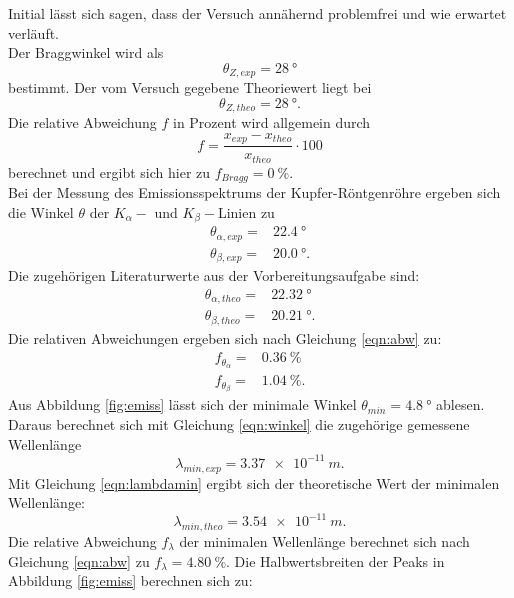 Initial lässt sich sagen, dass der Versuch annähernd problemfrei und wie erwartet verläuft.
\\Der Braggwinkel wird als
\begin{equation*}
  \theta_{Z, exp}=\SI{28}{°}
\end{equation*}
bestimmt.
Der vom Versuch gegebene Theoriewert liegt bei
\begin{equation*}
  \theta_{Z, theo}=\SI{28}{°}.
\end{equation*}
Die relative Abweichung $f$ in Prozent wird allgemein durch
\begin{equation}
  f= \frac{x_{exp}-x_{theo}}{x_{theo}}\cdot 100
  \label{eqn:abw}
\end{equation}
berechnet und ergibt sich hier zu $f_{Bragg}= \SI{0}{\%}$.
\\Bei der Messung des Emissionsspektrums der Kupfer-Röntgenröhre ergeben sich die Winkel $\theta$ der $K_{\alpha}-$ und $K_{\beta}-$Linien zu
\begin{align*}
  \theta_{\alpha, exp}  =& \SI{22.4}{°}\\
  \theta_{\beta, exp}   =& \SI{20.0}{°}.
\end{align*}
Die zugehörigen Literaturwerte \cite{2} aus der Vorbereitungsaufgabe sind:
\begin{align*}
  \theta_{\alpha, theo} =&\SI{22.32}{°}\\
  \theta_{\beta, theo}  =&\SI{20.21}{°}.
\end{align*}
Die relativen Abweichungen ergeben sich nach Gleichung \eqref{eqn:abw} zu:
\begin{align*}
  f_{\theta_{\alpha}} =&  \SI{0.36}{\%} \\
  f_{\theta_{\beta}}  =&  \SI{1.04}{\%}.
\end{align*}
Aus Abbildung \ref{fig:emiss} lässt sich der minimale Winkel $\theta_{min}=\SI{4.8}{°}$ ablesen.
Daraus berechnet sich mit Gleichung \eqref{eqn:winkel} die zugehörige gemessene Wellenlänge
\begin{equation*}
  \lambda_{min, exp}=\SI{3.37e-11}{m}.
\end{equation*}
Mit Gleichung \eqref{eqn:lambdamin} ergibt sich der theoretische Wert der minimalen Wellenlänge:
\begin{equation*}
  \lambda_{min, theo}=\SI{3.54e-11}{m}.
\end{equation*}
Die relative Abweichung $f_{\lambda}$ der minimalen Wellenlänge berechnet sich nach Gleichung \eqref{eqn:abw} zu $f_{\lambda}=\SI{4.80}{\%}$.
Die Halbwertsbreiten der Peaks in Abbildung \ref{fig:emiss} berechnen sich zu:
